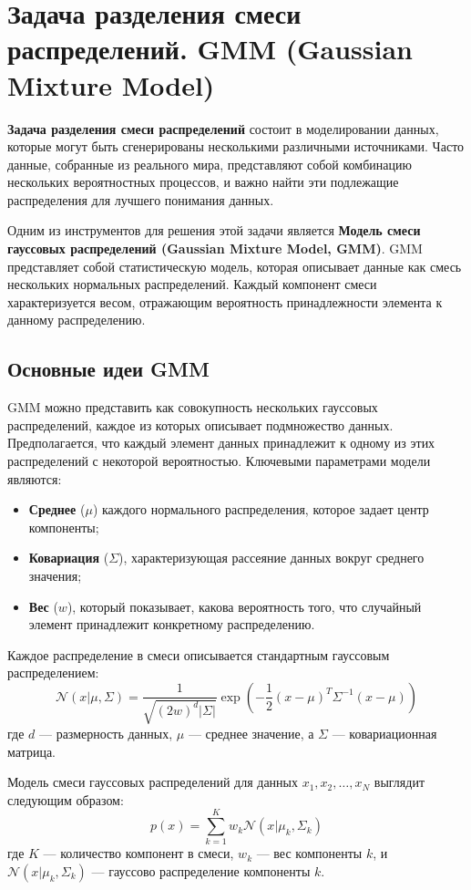 \section{Задача разделения смеси распределений. GMM (Gaussian Mixture Model)}

\textbf{Задача разделения смеси распределений} состоит в моделировании данных, которые могут быть сгенерированы несколькими различными источниками. Часто данные, собранные из реального мира, представляют собой комбинацию нескольких вероятностных процессов, и важно найти эти подлежащие распределения для лучшего понимания данных.

Одним из инструментов для решения этой задачи является \textbf{Модель смеси гауссовых распределений (Gaussian Mixture Model, GMM)}. GMM представляет собой статистическую модель, которая описывает данные как смесь нескольких нормальных распределений. Каждый компонент смеси характеризуется весом, отражающим вероятность принадлежности элемента к данному распределению.

\subsection{Основные идеи  GMM}

GMM можно представить как совокупность нескольких гауссовых распределений, каждое из которых описывает подмножество данных. Предполагается, что каждый элемент данных принадлежит к одному из этих распределений с некоторой вероятностью. Ключевыми параметрами модели являются:
\begin{itemize}
    \item \textbf{Среднее} ($\mu$) каждого нормального распределения, которое задает центр компоненты;
    \item \textbf{Ковариация} ($\Sigma$), характеризующая рассеяние данных вокруг среднего значения;
    \item \textbf{Вес} ($w$), который показывает, какова вероятность того, что случайный элемент принадлежит конкретному распределению.
\end{itemize}

Каждое распределение в смеси описывается стандартным гауссовым распределением:
\[
\mathcal{N}(x | \mu, \Sigma) = \frac{1}{\sqrt{(2 w)^d |\Sigma|}} \exp \left( -\frac{1}{2} (x - \mu)^T \Sigma^{-1} (x - \mu) \right)
\]
где $d$ — размерность данных, $\mu$ — среднее значение, а $\Sigma$ — ковариационная матрица.

Модель смеси гауссовых распределений для данных $x_1, x_2, \dots, x_N$ выглядит следующим образом:
\[
p(x) = \sum_{k=1}^{K} w_k \mathcal{N}(x | \mu_k, \Sigma_k)
\]
где $K$ — количество компонент в смеси, $w_k$ — вес компоненты $k$, и $\mathcal{N}(x | \mu_k, \Sigma_k)$ — гауссово распределение компоненты $k$.

